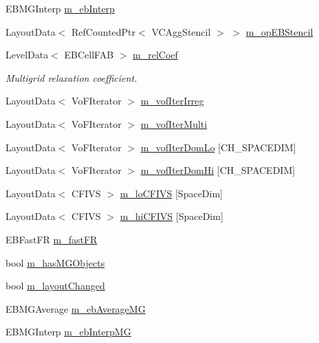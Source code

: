 \begin{DoxyCompactItemize}
E\+B\+M\+G\+Interp \hyperlink{classnwoebconductivityop_ad2edda646ce68834fccc58cc9f11c7f4}{m\+\_\+eb\+Interp}
\item 
Layout\+Data$<$ Ref\+Counted\+Ptr$<$ V\+C\+Agg\+Stencil $>$ $>$ \hyperlink{classnwoebconductivityop_a9996cd31c4a2de9fac89e92ac4c1a1be}{m\+\_\+op\+E\+B\+Stencil}
\item 
Level\+Data$<$ E\+B\+Cell\+F\+AB $>$ \hyperlink{classnwoebconductivityop_a4978a58a23d91f5be85f3583359b3733}{m\+\_\+rel\+Coef}
\begin{DoxyCompactList}\small\item\em Multigrid relaxation coefficient. \end{DoxyCompactList}\item 
Layout\+Data$<$ Vo\+F\+Iterator $>$ \hyperlink{classnwoebconductivityop_a5ad7de62d10b9222ad8374234d0310ef}{m\+\_\+vof\+Iter\+Irreg}
\item 
Layout\+Data$<$ Vo\+F\+Iterator $>$ \hyperlink{classnwoebconductivityop_a8eab6e7add0840870af534e9ef4ecab7}{m\+\_\+vof\+Iter\+Multi}
\item 
Layout\+Data$<$ Vo\+F\+Iterator $>$ \hyperlink{classnwoebconductivityop_a2fa55308faa74943daf40669588fecb7}{m\+\_\+vof\+Iter\+Dom\+Lo} \mbox{[}C\+H\+\_\+\+S\+P\+A\+C\+E\+D\+IM\mbox{]}
\item 
Layout\+Data$<$ Vo\+F\+Iterator $>$ \hyperlink{classnwoebconductivityop_a7f90fa9a10ffcdf8eb8fa5efba114788}{m\+\_\+vof\+Iter\+Dom\+Hi} \mbox{[}C\+H\+\_\+\+S\+P\+A\+C\+E\+D\+IM\mbox{]}
\item 
Layout\+Data$<$ C\+F\+I\+VS $>$ \hyperlink{classnwoebconductivityop_a9d34665cc2800ef1dabdc30e395d0d28}{m\+\_\+lo\+C\+F\+I\+VS} \mbox{[}Space\+Dim\mbox{]}
\item 
Layout\+Data$<$ C\+F\+I\+VS $>$ \hyperlink{classnwoebconductivityop_a7c16cb39cf7acdb7ea440202002c246c}{m\+\_\+hi\+C\+F\+I\+VS} \mbox{[}Space\+Dim\mbox{]}
\item 
E\+B\+Fast\+FR \hyperlink{classnwoebconductivityop_a03a22af12102c9da8cf44f21ef421801}{m\+\_\+fast\+FR}
\item 
bool \hyperlink{classnwoebconductivityop_adad94c8d9fb9a4494f4dacdd5a85a22e}{m\+\_\+has\+M\+G\+Objects}
\item 
bool \hyperlink{classnwoebconductivityop_a412d9ce04c02be6115ded42b36c9aa08}{m\+\_\+layout\+Changed}
\item 
E\+B\+M\+G\+Average \hyperlink{classnwoebconductivityop_a5b26a9a319f1c172d43c45da8270cb1f}{m\+\_\+eb\+Average\+MG}
\item 
E\+B\+M\+G\+Interp \hyperlink{classnwoebconductivityop_a679214af40c6abfb0073a4e1236f2260}{m\+\_\+eb\+Interp\+MG}

\end{DoxyCompactItemize}
